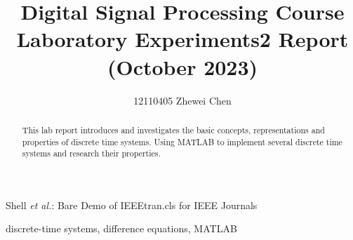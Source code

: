\documentclass[journal]{IEEEtran}
\begin{document}
\title{\color[rgb]{0,0.6,1}Digital Signal Processing Course Laboratory Experiments2 Report (October 2023)}

\author{12110405   Zhewei Chen}

{Shell \MakeLowercase{\textit{et al.}}: Bare Demo of IEEEtran.cls for IEEE Journals}
\maketitle

\begin{abstract}
   This lab report introduces and investigates the basic concepts, representations and properties of discrete time systems. Using MATLAB to implement several discrete time systems and research their properties.
\end{abstract}

\begin{IEEEkeywords}
   discrete-time systems, difference equations, MATLAB
\end{IEEEkeywords}


\IEEEpeerreviewmaketitle
\end{document}

